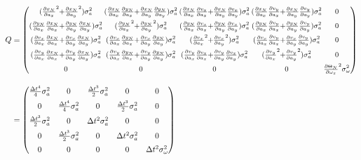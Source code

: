 \documentclass[12pt,a4paper]{article}
\renewcommand{\footnotesize}{\fontsize{9pt}{12pt}\selectfont}
\newcommand{\PA}[2]{\frac{\partial #1}{\partial #2}}
\begin{document}
	\begin{equation}
		\begin{split}
			Q&=
			\footnotesize
			\setlength{\arraycolsep}{1pt}
			\medmuskip = -0.5mu%
			\begin{pmatrix}
				(\PA{x_{N}}{a_{x}}^{2}+\PA{x_{N}}{a_{y}}^{2})\sigma_{a}^{2} & (\PA{x_{N}}{a_{x}}\PA{y_{N}}{a_{x}}+\PA{x_{N}}{a_{y}}\PA{y_{N}}{a_{y}})\sigma_{a}^{2} & (\PA{x_{N}}{a_{x}}\PA{v_{x}}{a_{x}}+\PA{x_{N}}{a_{y}}\PA{v_{x}}{a_{y}})\sigma_{a}^{2} & (\PA{x_{N}}{a_{x}}\PA{v_{y}}{a_{x}}+\PA{x_{N}}{a_{y}}\PA{v_{y}}{a_{y}})\sigma_{a}^{2} & 0 \\[0.5em]
				(\PA{y_{N}}{a_{x}}\PA{x_{N}}{a_{x}}+\PA{y_{N}}{a_{y}}\PA{x_{N}}{a_{y}})\sigma_{a}^{2} & (\PA{y_{N}}{a_{x}}^{2}+\PA{y_{N}}{a_{y}}^{2})\sigma_{a}^{2} & (\PA{y_{N}}{a_{x}}\PA{v_{x}}{a_{x}}+\PA{y_{N}}{a_{y}}\PA{v_{x}}{a_{y}})\sigma_{a}^{2} & (\PA{y_{N}}{a_{x}}\PA{v_{y}}{a_{x}}+\PA{y_{N}}{a_{y}}\PA{v_{y}}{a_{y}})\sigma_{a}^{2} & 0 \\[0.5em]
				(\PA{v_{x}}{a_{x}}\PA{x_{N}}{a_{x}}+\PA{v_{x}}{a_{y}}\PA{x_{N}}{a_{y}})\sigma_{a}^{2} & (\PA{v_{x}}{a_{x}}\PA{y_{N}}{a_{x}}+\PA{v_{x}}{a_{y}}\PA{y_{N}}{a_{y}})\sigma_{a}^{2} & (\PA{v_{x}}{a_{x}}^{2}+\PA{v_{x}}{a_{y}}^{2})\sigma_{a}^{2} & (\PA{v_{x}}{a_{x}}\PA{v_{y}}{a_{x}}+\PA{v_{x}}{a_{y}}\PA{v_{y}}{a_{y}})\sigma_{a}^{2} & 0 \\[0.5em]
				(\PA{v_{y}}{a_{x}}\PA{x_{N}}{a_{x}}+\PA{v_{y}}{a_{y}}\PA{x_{N}}{a_{y}})\sigma_{a}^{2} & (\PA{v_{y}}{a_{x}}\PA{y_{N}}{a_{x}}+\PA{v_{y}}{a_{y}}\PA{y_{N}}{a_{y}})\sigma_{a}^{2} & (\PA{v_{y}}{a_{x}}\PA{v_{x}}{a_{x}}+\PA{v_{y}}{a_{y}}\PA{v_{x}}{a_{y}})\sigma_{a}^{2} & (\PA{v_{y}}{a_{x}}^{2}+\PA{v_{y}}{a_{y}}^{2})\sigma_{a}^{2} & 0 \\[0.5em]
				0 & 0 & 0 & 0 & \PA{\Theta_{N}}{\omega_{z}}^{2}\sigma_{\omega}^{2}
			\end{pmatrix}\\[1em]
			&=
			\begin{pmatrix}
				\frac{\Delta t^{4}}{4}\sigma_{a}^{2} & 0 & \frac{\Delta t^{3}}{2}\sigma_{a}^{2} & 0 & 0 \\[0.5em]
				0 & \frac{\Delta t^{4}}{4}\sigma_{a}^{2} & 0 & \frac{\Delta t^{3}}{2}\sigma_{a}^{2} & 0 \\[0.5em]
				\frac{\Delta t^{3}}{2}\sigma_{a}^{2} & 0 & \Delta t^{2}\sigma_{a}^{2} & 0 & 0 \\[0.5em]
				0 & \frac{\Delta t^{3}}{2}\sigma_{a}^{2} & 0 & \Delta t^{2}\sigma_{a}^{2} & 0 \\[0.5em]
				0 & 0 & 0 & 0 & \Delta t^{2}\sigma_{\omega}^{2}
			\end{pmatrix}\\[1em]
		\end{split}
		\label{eq:Prozessrauschkovarianzmatrix}
	\end{equation}
\end{document}
